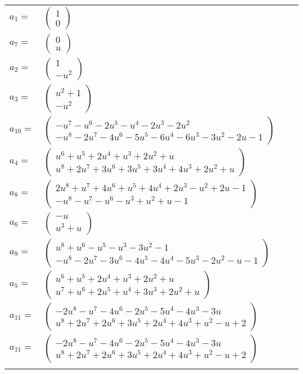 \documentclass[1p]{elsarticle_modified}
\theoremstyle{definition}
\begin{document}
\begin{tabular}{m{7pt} m{180pt} m{7pt} m{180pt} }
\flushright $a_{1}=$&$\begin{pmatrix}1\\0\end{pmatrix}$ \\
\flushright $a_{7}=$&$\begin{pmatrix}0\\u\end{pmatrix}$ \\
\flushright $a_{2}=$&$\begin{pmatrix}1\\- u^2\end{pmatrix}$ \\
\flushright $a_{3}=$&$\begin{pmatrix}u^2+1\\- u^2\end{pmatrix}$ \\
\flushright $a_{10}=$&$\begin{pmatrix}- u^7- u^6-2 u^5- u^4-2 u^3-2 u^2\\- u^8-2 u^7-4 u^6-5 u^5-6 u^4-6 u^3-3 u^2-2 u-1\end{pmatrix}$ \\
\flushright $a_{4}=$&$\begin{pmatrix}u^6+u^5+2 u^4+u^3+2 u^2+u\\u^8+2 u^7+3 u^6+3 u^5+3 u^4+4 u^3+2 u^2+u\end{pmatrix}$ \\
\flushright $a_{8}=$&$\begin{pmatrix}2 u^8+u^7+4 u^6+u^5+4 u^4+2 u^3- u^2+2 u-1\\- u^8- u^7- u^6- u^3+u^2+u-1\end{pmatrix}$ \\
\flushright $a_{6}=$&$\begin{pmatrix}- u\\u^3+u\end{pmatrix}$ \\
\flushright $a_{9}=$&$\begin{pmatrix}u^8+u^6- u^5- u^3-3 u^2-1\\- u^8-2 u^7-3 u^6-4 u^5-4 u^4-5 u^3-2 u^2- u-1\end{pmatrix}$ \\
\flushright $a_{5}=$&$\begin{pmatrix}u^6+u^5+2 u^4+u^3+2 u^2+u\\u^7+u^6+2 u^5+u^4+3 u^3+2 u^2+u\end{pmatrix}$ \\
\flushright $a_{11}=$&$\begin{pmatrix}-2 u^8- u^7-4 u^6-2 u^5-5 u^4-4 u^3-3 u\\u^8+2 u^7+2 u^6+3 u^5+2 u^4+4 u^3+u^2- u+2\end{pmatrix}$\\ \flushright $a_{11}=$&$\begin{pmatrix}-2 u^8- u^7-4 u^6-2 u^5-5 u^4-4 u^3-3 u\\u^8+2 u^7+2 u^6+3 u^5+2 u^4+4 u^3+u^2- u+2\end{pmatrix}$\\&\end{tabular}
\end{document}
